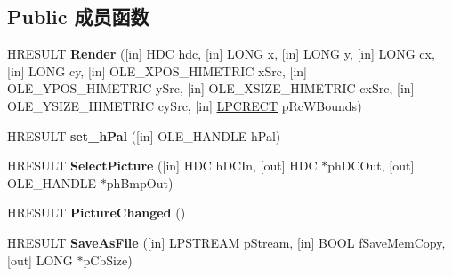 \subsection*{Public 成员函数}
\begin{DoxyCompactItemize}
\item 
\mbox{\label{interface_i_picture_a834d4b5fe06fa0d860b996ae33c6dce4}} 
H\+R\+E\+S\+U\+LT {\bfseries Render} (\mbox{[}in\mbox{]} H\+DC hdc, \mbox{[}in\mbox{]} L\+O\+NG x, \mbox{[}in\mbox{]} L\+O\+NG y, \mbox{[}in\mbox{]} L\+O\+NG cx, \mbox{[}in\mbox{]} L\+O\+NG cy, \mbox{[}in\mbox{]} O\+L\+E\+\_\+\+X\+P\+O\+S\+\_\+\+H\+I\+M\+E\+T\+R\+IC x\+Src, \mbox{[}in\mbox{]} O\+L\+E\+\_\+\+Y\+P\+O\+S\+\_\+\+H\+I\+M\+E\+T\+R\+IC y\+Src, \mbox{[}in\mbox{]} O\+L\+E\+\_\+\+X\+S\+I\+Z\+E\+\_\+\+H\+I\+M\+E\+T\+R\+IC cx\+Src, \mbox{[}in\mbox{]} O\+L\+E\+\_\+\+Y\+S\+I\+Z\+E\+\_\+\+H\+I\+M\+E\+T\+R\+IC cy\+Src, \mbox{[}in\mbox{]} \hyperlink{structtag_r_e_c_t}{L\+P\+C\+R\+E\+CT} p\+Rc\+W\+Bounds)
\item 
\mbox{\label{interface_i_picture_ab47a37c73dfadd95e4801971c51b4617}} 
H\+R\+E\+S\+U\+LT {\bfseries set\+\_\+h\+Pal} (\mbox{[}in\mbox{]} O\+L\+E\+\_\+\+H\+A\+N\+D\+LE h\+Pal)
\item 
\mbox{\label{interface_i_picture_a971f376025c91ffa4625df6bce2492d0}} 
H\+R\+E\+S\+U\+LT {\bfseries Select\+Picture} (\mbox{[}in\mbox{]} H\+DC h\+D\+C\+In, \mbox{[}out\mbox{]} H\+DC $\ast$ph\+D\+C\+Out, \mbox{[}out\mbox{]} O\+L\+E\+\_\+\+H\+A\+N\+D\+LE $\ast$ph\+Bmp\+Out)
\item 
\mbox{\label{interface_i_picture_a72e09ab70c4fe4540e53ae087be8e79f}} 
H\+R\+E\+S\+U\+LT {\bfseries Picture\+Changed} ()
\item 
\mbox{\label{interface_i_picture_ac457e0eccd84b8aa45b159ae7e28f998}} 
H\+R\+E\+S\+U\+LT {\bfseries Save\+As\+File} (\mbox{[}in\mbox{]} L\+P\+S\+T\+R\+E\+AM p\+Stream, \mbox{[}in\mbox{]} B\+O\+OL f\+Save\+Mem\+Copy, \mbox{[}out\mbox{]} L\+O\+NG $\ast$p\+Cb\+Size)
\end{DoxyCompactItemize}
